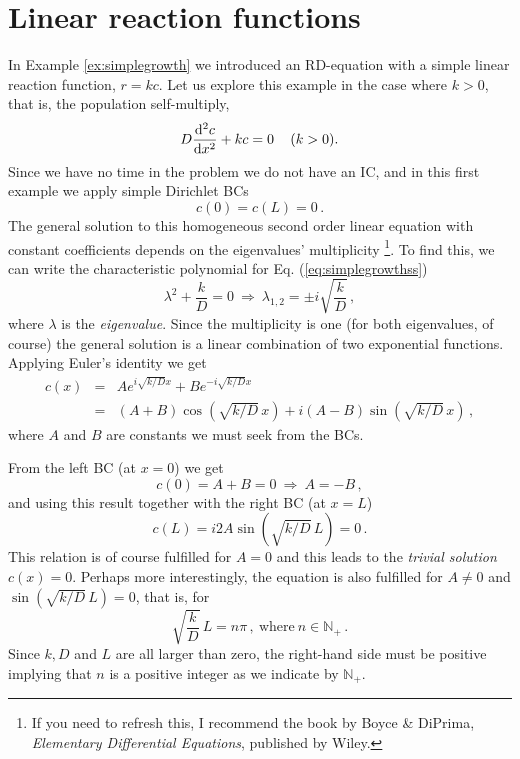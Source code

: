 \section{Linear reaction functions \label{stst:sectBVP}}
In Example \ref{ex:simplegrowth} we 
introduced an RD-equation with a simple linear reaction function, $r=kc$.  
Let us explore this example in the case where $k>0$, that is, the population
self-multiply,  
\begin{equation}
  \label{eq:simplegrowthss}
	D\frac{\mathrm{d}^2c}{\mathrm{d} x^2} + kc=0 \, \ \ \ (k>0).
\end{equation}
Since we have no time in the problem we do not have an IC, and in this first
example we apply simple Dirichlet BCs
\begin{equation}
  c(0)=c(L)=0 \, .
\end{equation}
The general solution to this homogeneous second order linear equation with
constant coefficients depends on the eigenvalues' multiplicity 
\footnote{If you need to refresh this, I recommend the book 
by Boyce \& DiPrima, \emph{Elementary Differential Equations}, 
published by Wiley.}. To find this, we can write the characteristic polynomial for
Eq. (\ref{eq:simplegrowthss}) 
\begin{equation}
	\lambda^2 + \frac{k}{D} = 0 \ \Rightarrow \ \lambda_{1,2} = \pm i \sqrt{\frac{k}{D}}   \, ,
	 \label{eq:eigInfinite}
\end{equation}
where $\lambda$ is the \emph{eigenvalue}. Since the multiplicity is one 
(for both eigenvalues, of course) the general solution is 
a linear combination of two exponential functions. Applying Euler's identity we get
\begin{eqnarray}
  c(x) &=& A e^{i \sqrt{k/D} x} + B e^{-i \sqrt{k/D} x}
           \nonumber \\
       &=& (A+B)\cos\left(\sqrt{k/D}\,x\right) +
           i(A-B)\sin\left(\sqrt{k/D}\,x\right) \, ,
		   \label{eq:stsgeneral2order}
\end{eqnarray}
where $A$ and $B$ are constants we must seek from the BCs. 

From the left BC (at $x=0$) we get
\begin{equation}
  c(0) = A + B = 0 \ \Rightarrow \ A = -B   \, ,
\end{equation}
and using this result together with the right BC (at $x=L$)
\begin{equation}
  c(L) = i2A\sin\left(\sqrt{k/D}\,L\right) = 0 \, .
\end{equation}
This relation is of course fulfilled for $A=0$ and this leads to the 
\emph{trivial solution} $c(x)=0$. Perhaps more interestingly, the equation is also 
fulfilled for $A\neq 0$ and $\sin(\sqrt{k/D}\,L ) = 0$, that is, for
\begin{equation}
  \label{eq:constraintL}
	\sqrt{\frac{k}{D}} \, L = n\pi \, , \ \text{where} \ n \in \mathbb{N}_+ \, .
\end{equation}
Since $k, D$ and $L$ are all larger than zero, the right-hand side must be positive 
implying that $n$ is a positive integer as we indicate by $\mathbb{N}_+$. 

